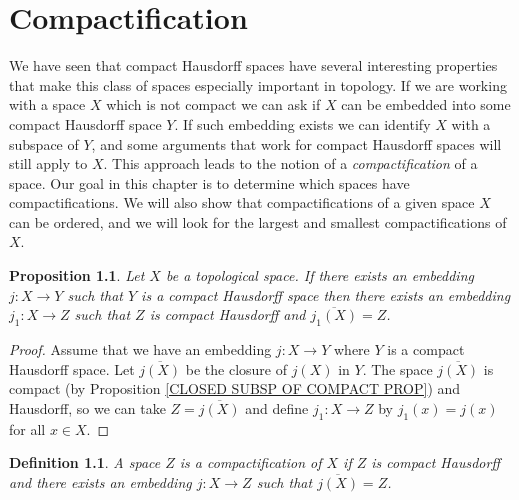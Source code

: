 \documentclass[11pt, letterpaper, oneside]{report}
\renewcommand{\chaptermark}[1]{\markboth{#1}{}}
\theoremstyle{pplain}
\newtheorem{proposition}[theorem]{Proposition}
\newtheorem{ITERMVALUE THM}[theorem]{Intermediate Value Theorem}
\newtheorem{HEINEBOREL THM}[theorem]{Heine-Borel Theorem}
\newtheorem{UMETR THM}[theorem]{Urysohn Metrization Theorem}
\newtheorem{UMETR2 THM}[theorem]{Urysohn Metrization Theorem (v.2)}
\theoremstyle{ddefinition}
\newtheorem{definition}[theorem]{Definition}
\theoremstyle{nnn}
\newtheorem{TDA NN}[theorem]{Topological Data Analysis. }
\theoremstyle{eexercise}
\begin{document}
\chapter{Compactification}
\chaptermark{Compactification}
\label{COMPACTIFICATION CHAPTER}


\thispagestyle{firststyle}



We have seen that compact Hausdorff spaces have several interesting properties 
that make this class of spaces especially important in topology. 
If we are working with a space $X$ which is not compact  we can ask if  $X$ can be 
embedded into some compact Hausdorff space $Y$. If such embedding exists  we can identify 
$X$ with a subspace of  $Y$, and  some arguments that work for compact Hausdorff
spaces will still apply to $X$. This approach leads to the notion of a  \emph{compactification}
of a space. Our goal in this chapter is  to determine which spaces have compactifications. 
We will also show that compactifications of a given space $X$ can be ordered, and we will look for 
the largest and smallest compactifications of $X$. 




\begin{proposition}
\label{DENSE COMPACT EMBEDDING PROP}
Let $X$ be a topological space. If there exists an embedding $j\colon X\to Y$ such that 
$Y$ is a compact Hausdorff space then there exists an embedding $j_{1}\colon X \to Z$
such that $Z$ is compact Hausdorff and $\overline{j_{1}(X)} = Z$. 
\end{proposition}


\begin{proof}
Assume that we have an embedding $j\colon  X\to Y$ where $Y$ is a compact Hausdorff space. 
Let $\overline{j(X)}$ be the closure of $j(X)$ in $Y$. The space  $\overline{j(X)}$ is 
compact (by Proposition \ref{CLOSED SUBSP OF COMPACT PROP})  and Hausdorff, so  
 we can take $Z = \overline{j(X)}$ and define $j_{1}\colon X \to Z$ by $j_{1}(x) = j(x)$
for all $x\in X$. 
\end{proof}

\begin{definition}
A space $Z$ is a \emph{compactification} of  $X$ if $Z$ is compact Hausdorff 
and  there exists an embedding $j\colon X\to Z$ such that $\overline{j(X)} = Z$.  
\end{definition}
\end{document}
